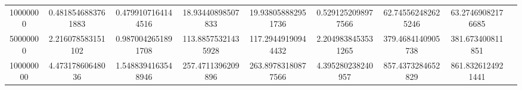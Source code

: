 \begin{table}[ht]
{\begin{tabular}{@{}S[table-format=9]SSSSSSSS@{}}
            10000000            & 0.4818546883761883  & 0.4799107164144516 & 18.93440898507833  & 19.938058882951736 & 0.5291252098977566 & 62.745562482625246 & 63.27469082176685  \\
            50000000            & 2.216078583151102   & 0.9870042651891708 & 113.88575321435928 & 117.29449190944432 & 2.2049838453531265 & 379.4684140905738  & 381.673400811851   \\
            100000000           & 4.47317860648036    & 1.5488394163548946 & 257.4711396209896  & 263.89783180877566 & 4.395280238240957  & 857.4373284652829  & 861.8326124921441  \\
            \bottomrule
        \end{tabular}\label{table:efficiency_parquet-70percent}
    }
\end{table}